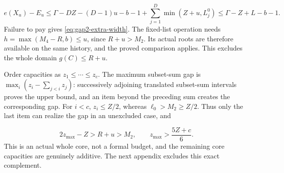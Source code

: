 \documentclass[11pt,a4paper]{article}
\theoremstyle{definition}
\begin{document}
\[
e(X_u)-E_u\le
\Gamma-DZ-(D-1)u-b-1+\sum_{j=1}^D\min(Z+u,L_j^0)
\le\Gamma-Z+L-b-1.
\]
Failure to pay gives \eqref{eq:gap2-extra-width}.
The fixed-list operation needs
$h=\max(M_4-R,b)\le u$, since $R+u>M_2$.
Its actual roots are therefore available on the same history, and the
proved comparison applies. This excludes the whole domain $g(C)\le R+u$.

Order capacities as $z_1\le\cdots\le z_c$.
The maximum subset-sum gap is
$\max_i(z_i-\sum_{j<i}z_j)$:
successively adjoining translated subset-sum intervals proves the upper bound,
and an item beyond the preceding sum creates the corresponding gap.
For $i<c$, $z_i\le Z/2$, whereas $\ell_0>M_2\ge Z/2$.
Thus only the last item can realize the gap in an unexcluded case, and

\begin{equation}\label{eq:gap2-dominant}
2z_{\max}-Z>R+u>M_2,\qquad
z_{\max}>\frac{5Z+c}{6}.
\end{equation}
This is an actual whole core, not a formal budget,
and the remaining core capacities are genuinely additive.
The next appendix excludes this exact complement.
\end{document}
